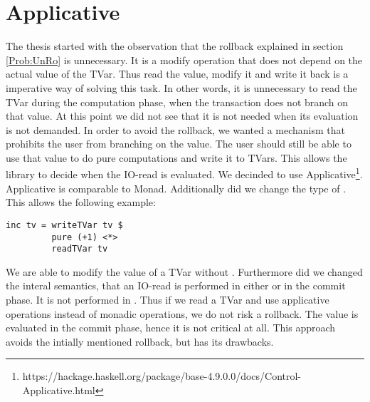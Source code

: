
\chapter{Applicative} %

\label{AppendixA} %

The thesis started with the observation that the rollback explained in section \ref{Prob:UnRo} is 
unnecessary. It is a modify operation that does not depend on the actual value of the TVar. Thus 
read the value, modify it and write it back is a imperative way of solving this task. In other 
words, it is unnecessary to read the TVar during the computation phase, when the transaction does
not branch on that value. At this point we did not see that it is not needed when its evaluation is
not demanded. In order to avoid the rollback, we wanted a mechanism that prohibits the user from 
branching on the value. The user should still be able to use that value to do pure computations and 
write it to TVars. This allows the library to decide when the IO-read is evaluated. We decinded to 
use Applicative\footnote{https://hackage.haskell.org/package/base-4.9.0.0/docs/Control-Applicative.html}.
Applicative is comparable to Monad. Additionally did we change the type of 
. This allows the following
example: 
\begin{lstlisting}
inc tv = writeTVar tv $ 
         pure (+1) <*> 
         readTVar tv
\end{lstlisting}
We are able to modify the value of a TVar without \code{>>=}. Furthermore did we changed the interal
semantics, that an IO-read is performed in either \code{>>=} or in the commit phase. It is not performed
in . Thus if we read a TVar and use applicative operations instead of monadic operations,
we do not risk a rollback. The value is evaluated in the commit phase, hence it is not critical at all.
This approach avoids the intially mentioned rollback, but has its drawbacks. 

